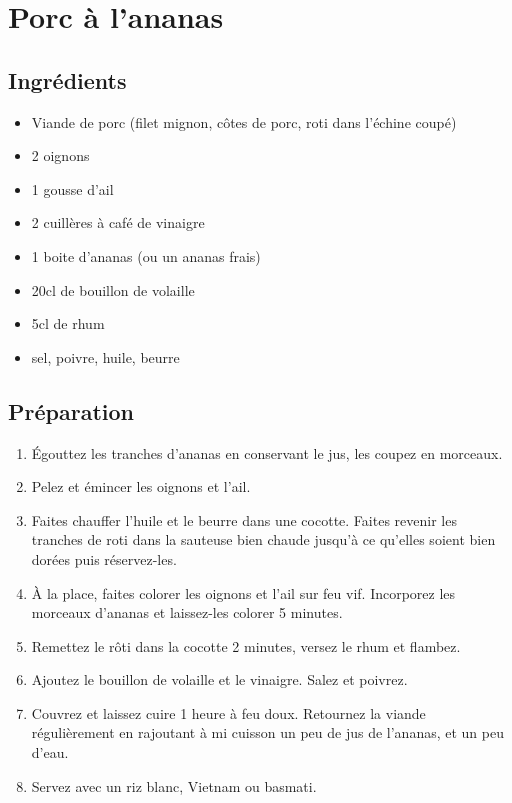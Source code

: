 \newpage
\section{Porc à l'ananas}
\subsection*{Ingrédients}
\begin{itemize}
\item Viande de porc (filet mignon, côtes de porc, roti dans l'échine coupé)
\item 2 oignons
\item 1 gousse d'ail
\item 2 cuillères à café de vinaigre
\item 1 boite d'ananas (ou un ananas frais)
\item 20cl de bouillon de volaille
\item 5cl de rhum
\item sel, poivre, huile, beurre
\end{itemize}

\subsection*{Préparation}
\begin{enumerate}
\item Égouttez les tranches d’ananas en conservant le jus, les coupez en morceaux.
\item Pelez et émincer les oignons et l’ail.
\item Faites chauffer l’huile et le beurre dans une cocotte. Faites revenir les tranches de roti dans la sauteuse bien chaude jusqu'à ce qu'elles soient bien dorées puis réservez-les.
\item À la place, faites colorer les oignons et l’ail sur feu vif. Incorporez les morceaux d’ananas et laissez-les colorer 5 minutes.
\item Remettez le rôti dans la cocotte 2 minutes, versez le rhum et flambez.
\item Ajoutez le bouillon de volaille et le vinaigre. Salez et poivrez.
\item Couvrez et laissez cuire 1 heure à feu doux. Retournez la viande régulièrement en rajoutant à mi cuisson un peu de jus de l’ananas, et un peu d’eau.
\item Servez avec un riz blanc, Vietnam ou basmati.
\end{enumerate}

